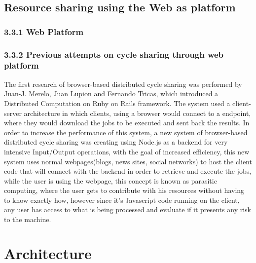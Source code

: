 \documentclass{./llncs2e/llncs}
\begin{document}

% 
% 
\subsection{Resource sharing using the Web as platform} 


\subsubsection{3.3.1 Web Platform}

\subsubsection{3.3.2 Previous attempts on cycle sharing through web platform}
The first research of browser-based distributed cycle sharing was performed by Juan-J. Merelo, Juan Lupion and Fernando Tricas, which introduced a Distributed Computation on Ruby on Rails framework\cite{Merelo2007}. The system used a client-server architecture in which clients, using a browser would connect to a endpoint, where they would download the jobs to be executed and sent back the results. In order to increase the performance of this system, a new system\cite{Duda2013} of browser-based distributed cycle sharing was creating using Node.js as a backend for very intensive Input/Output operations\cite{Tilkov2010}, with the goal of increased efficiency, this new system uses normal webpages(blogs, news sites, social networks) to host the client code that will connect with the backend in order to retrieve and execute the jobs, while the user is using the webpage, this concept is known as parasitic computing\cite{Barabasi2001}, where the user gets to contribute with his resources without having to know exactly how, however since it's Javascript code running on the client, any user has access to what is being processed and evaluate if it presents any risk to the machine.



% 
% 

\section{Architecture}
\end{document}
